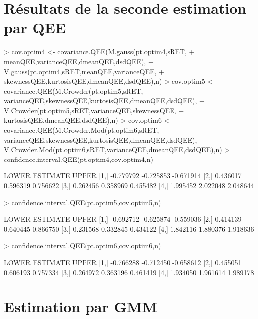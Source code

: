 \documentclass{report}
\begin{document}
\section{Résultats de la seconde estimation par QEE}

\begin{Schunk}
\begin{Sinput}
> cov.optim4 <- covariance.QEE(M.gauss(pt.optim4,sRET,
+ 				meanQEE,varianceQEE,dmeanQEE,dsdQEE),
+ 		V.gauss(pt.optim4,sRET,meanQEE,varianceQEE,
+ 				skewnessQEE,kurtosisQEE,dmeanQEE,dsdQEE),n)
> cov.optim5 <- covariance.QEE(M.Crowder(pt.optim5,sRET,
+ 				varianceQEE,skewnessQEE,kurtosisQEE,dmeanQEE,dsdQEE),
+ 		V.Crowder(pt.optim5,sRET,varianceQEE,skewnessQEE,
+ 				kurtosisQEE,dmeanQEE,dsdQEE),n)
> cov.optim6 <- covariance.QEE(M.Crowder.Mod(pt.optim6,sRET,
+ 				varianceQEE,skewnessQEE,kurtosisQEE,dmeanQEE,dsdQEE),
+ 		V.Crowder.Mod(pt.optim6,sRET,varianceQEE,dmeanQEE,dsdQEE),n)
> confidence.interval.QEE(pt.optim4,cov.optim4,n)
\end{Sinput}
\begin{Soutput}
         LOWER  ESTIMATE     UPPER
[1,] -0.779792 -0.725853 -0.671914
[2,]  0.436017  0.596319  0.756622
[3,]  0.262456  0.358969  0.455482
[4,]  1.995452  2.022048  2.048644
\end{Soutput}
\begin{Sinput}
> confidence.interval.QEE(pt.optim5,cov.optim5,n)
\end{Sinput}
\begin{Soutput}
         LOWER  ESTIMATE     UPPER
[1,] -0.692712 -0.625874 -0.559036
[2,]  0.414139  0.640445  0.866750
[3,]  0.231568  0.332845  0.434122
[4,]  1.842116  1.880376  1.918636
\end{Soutput}
\begin{Sinput}
> confidence.interval.QEE(pt.optim6,cov.optim6,n)
\end{Sinput}
\begin{Soutput}
         LOWER  ESTIMATE     UPPER
[1,] -0.766288 -0.712450 -0.658612
[2,]  0.455051  0.606193  0.757334
[3,]  0.264972  0.363196  0.461419
[4,]  1.934050  1.961614  1.989178
\end{Soutput}
\end{Schunk}

\section{Estimation par GMM}
\end{document}
